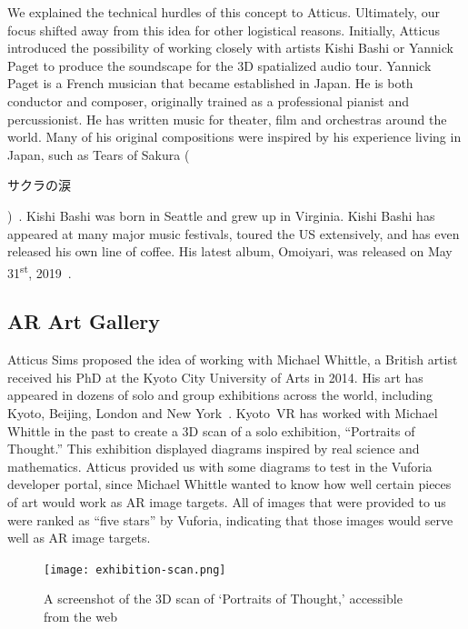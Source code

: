 \documentclass[a4paper, 10pt, american, titlepage]{article}
\begin{document}
We explained the technical hurdles of this concept to Atticus. Ultimately, our
focus shifted away from this idea for other logistical reasons. Initially,
Atticus introduced the possibility of working closely with artists Kishi Bashi
or Yannick Paget to produce the soundscape for the 3D spatialized audio tour.
Yannick Paget is a French musician that became established in Japan. He is both
conductor and composer, originally trained as a professional pianist and
percussionist. He has written music for theater, film and orchestras around the
world. Many of his original compositions were inspired by his experience living
in Japan, such as Tears of Sakura
(\begin{CJK}{UTF8}{min}サクラの涙\end{CJK})~\autocite{yannickpaget2016}. Kishi
Bashi was born in Seattle and grew up in Virginia. Kishi Bashi has appeared at
many major music festivals, toured the US extensively, and has even released his
own line of coffee. His latest album, Omoiyari, was released on May
31\textsuperscript{st}, 2019~\autocite{kishibashi2019}.

\subsection{AR Art Gallery}
\label{sec:arArtGallery}

Atticus Sims proposed the idea of working with Michael Whittle, a British artist
received his PhD at the Kyoto City University of Arts in 2014. His art has
appeared in dozens of solo and group exhibitions across the world,
including Kyoto, Beijing, London and New York~\autocite{michaelwhittle2019}.
Kyoto~VR has worked with Michael Whittle in the past to create a 3D scan of a
solo exhibition, ``Portraits of Thought.'' This exhibition displayed diagrams
inspired by real science and mathematics. Atticus provided us with some
diagrams to test in the Vuforia developer portal, since Michael Whittle wanted
to know how well certain pieces of art would work as AR image targets. All of
images that were provided to us were ranked as ``five stars'' by Vuforia,
indicating that those images would serve well as AR image targets.

\begin{figure}[h]
	\centering
	\texttt{[image: exhibition-scan.png]}
    \caption{A screenshot of the 3D scan of `Portraits of Thought,' accessible
    from the web}
	\label{fig:exhibitionScan}
\end{figure}

\clearpage
\end{document}
